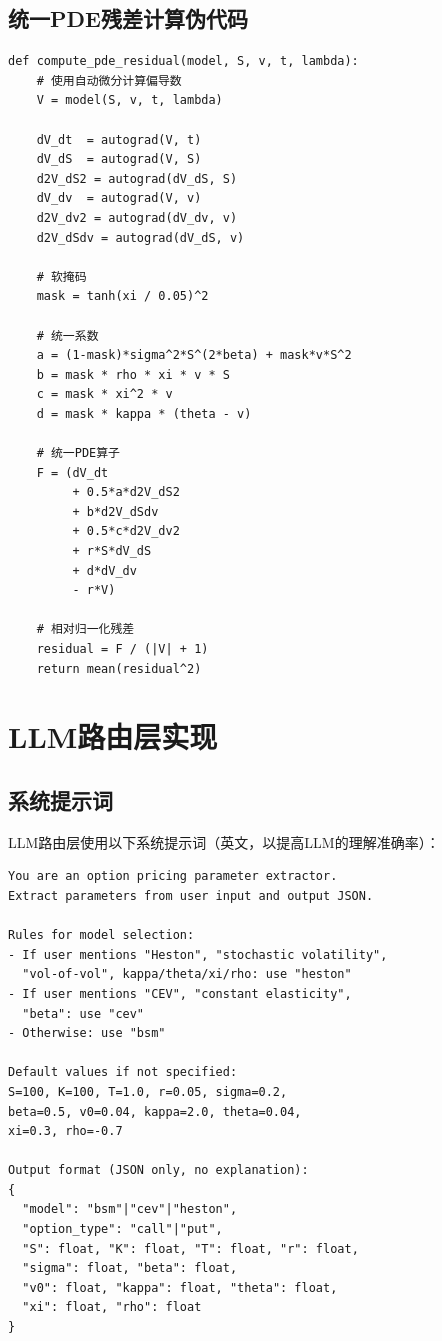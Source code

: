 \subsection{统一PDE残差计算伪代码}

\begin{verbatim}
def compute_pde_residual(model, S, v, t, lambda):
    # 使用自动微分计算偏导数
    V = model(S, v, t, lambda)

    dV_dt  = autograd(V, t)
    dV_dS  = autograd(V, S)
    d2V_dS2 = autograd(dV_dS, S)
    dV_dv  = autograd(V, v)
    d2V_dv2 = autograd(dV_dv, v)
    d2V_dSdv = autograd(dV_dS, v)

    # 软掩码
    mask = tanh(xi / 0.05)^2

    # 统一系数
    a = (1-mask)*sigma^2*S^(2*beta) + mask*v*S^2
    b = mask * rho * xi * v * S
    c = mask * xi^2 * v
    d = mask * kappa * (theta - v)

    # 统一PDE算子
    F = (dV_dt
         + 0.5*a*d2V_dS2
         + b*d2V_dSdv
         + 0.5*c*d2V_dv2
         + r*S*dV_dS
         + d*dV_dv
         - r*V)

    # 相对归一化残差
    residual = F / (|V| + 1)
    return mean(residual^2)
\end{verbatim}

\section{LLM路由层实现}

\subsection{系统提示词}

LLM路由层使用以下系统提示词（英文，以提高LLM的理解准确率）：

\begin{verbatim}
You are an option pricing parameter extractor.
Extract parameters from user input and output JSON.

Rules for model selection:
- If user mentions "Heston", "stochastic volatility",
  "vol-of-vol", kappa/theta/xi/rho: use "heston"
- If user mentions "CEV", "constant elasticity",
  "beta": use "cev"
- Otherwise: use "bsm"

Default values if not specified:
S=100, K=100, T=1.0, r=0.05, sigma=0.2,
beta=0.5, v0=0.04, kappa=2.0, theta=0.04,
xi=0.3, rho=-0.7

Output format (JSON only, no explanation):
{
  "model": "bsm"|"cev"|"heston",
  "option_type": "call"|"put",
  "S": float, "K": float, "T": float, "r": float,
  "sigma": float, "beta": float,
  "v0": float, "kappa": float, "theta": float,
  "xi": float, "rho": float
}
\end{verbatim}

